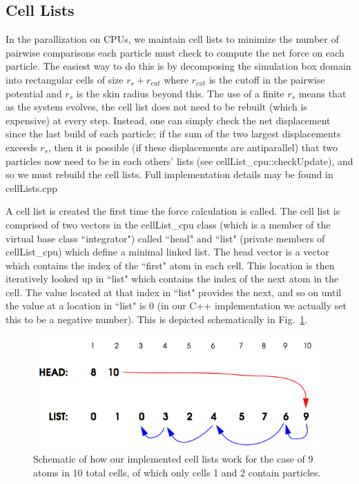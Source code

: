 \documentclass[12pt]{article}
\begin{document}
\subsection{Cell Lists}
In the parallization on CPUs, we maintain cell lists to minimize the number of pairwise comparisons each particle must check to compute the net force on each particle.  The easiest way to do this is by decomposing the simulation box domain into rectangular cells of size $r_s + r_{cut}$ where $r_{cut}$ is the cutoff in the pairwise potential and $r_s$ is the skin radius beyond this.  The use of a finite $r_s$ means that as the system evolves, the cell list does not need to be rebuilt (which is expensive) at every step.  Instead, one can simply check the net displacement since the last build of each particle; if the sum of the two largest displacements exceeds $r_s$, then it is possible (if these displacements are antiparallel) that two particles now need to be in each others' lists (see cellList\_cpu::checkUpdate), and so we must rebuild the cell lists.  Full implementation details may be found in cellLists.cpp

A cell list is created the first time the force calculation is called.  The cell list is comprised of two vectors in the cellList\_cpu class (which is a member of the virtual base class ``integrator") called ``head" and ``list" (private members of cellList\_cpu) which define a minimal linked list.
The head vector is a vector which contains the index of the ``first" atom in each cell.  This location is then iteratively looked up in ``list" which contains the index of the next atom in the cell.  The value located at that index in ``list"  provides the next, and so on until the value at a location in ``list" is 0 (in our C++ implementation we actually set this to be a negative number).  This is depicted schematically in Fig.~\ref{fig:cell}.

\begin{figure}[H]
   	\includegraphics[width=\textwidth]{cell_list.png}
	\caption{Schematic of how our implemented cell lists work for the case of 9 atoms in 10 total cells, of which only cells 1 and 2 contain particles.}
	\label{fig:cell}
\end{figure}
\end{document}
